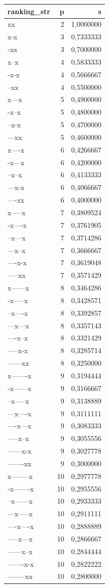 \documentclass[
  letterpaper,
  DIV=11,
  numbers=noendperiod]{scrreprt}
\begin{document}
\begin{longtable*}{lrr}
\toprule
ranking\_str & p & s \\ 
\midrule\addlinespace[2.5pt]
xx & 2 & 1,0000000 \\ 
x-x & 3 & 0,7333333 \\ 
-xx & 3 & 0,7000000 \\ 
x--x & 4 & 0,5833333 \\ 
-x-x & 4 & 0,5666667 \\ 
--xx & 4 & 0,5500000 \\ 
x---x & 5 & 0,4900000 \\ 
-x--x & 5 & 0,4800000 \\ 
--x-x & 5 & 0,4700000 \\ 
---xx & 5 & 0,4600000 \\ 
x----x & 6 & 0,4266667 \\ 
-x---x & 6 & 0,4200000 \\ 
--x--x & 6 & 0,4133333 \\ 
---x-x & 6 & 0,4066667 \\ 
----xx & 6 & 0,4000000 \\ 
x-----x & 7 & 0,3809524 \\ 
-x----x & 7 & 0,3761905 \\ 
--x---x & 7 & 0,3714286 \\ 
---x--x & 7 & 0,3666667 \\ 
----x-x & 7 & 0,3619048 \\ 
-----xx & 7 & 0,3571429 \\ 
x------x & 8 & 0,3464286 \\ 
-x-----x & 8 & 0,3428571 \\ 
--x----x & 8 & 0,3392857 \\ 
---x---x & 8 & 0,3357143 \\ 
----x--x & 8 & 0,3321429 \\ 
-----x-x & 8 & 0,3285714 \\ 
------xx & 8 & 0,3250000 \\ 
x-------x & 9 & 0,3194444 \\ 
-x------x & 9 & 0,3166667 \\ 
--x-----x & 9 & 0,3138889 \\ 
---x----x & 9 & 0,3111111 \\ 
----x---x & 9 & 0,3083333 \\ 
-----x--x & 9 & 0,3055556 \\ 
------x-x & 9 & 0,3027778 \\ 
-------xx & 9 & 0,3000000 \\ 
x--------x & 10 & 0,2977778 \\ 
-x-------x & 10 & 0,2955556 \\ 
--x------x & 10 & 0,2933333 \\ 
---x-----x & 10 & 0,2911111 \\ 
----x----x & 10 & 0,2888889 \\ 
-----x---x & 10 & 0,2866667 \\ 
------x--x & 10 & 0,2844444 \\ 
-------x-x & 10 & 0,2822222 \\ 
--------xx & 10 & 0,2800000 \\ 
\bottomrule
\end{longtable*}
\end{document}
